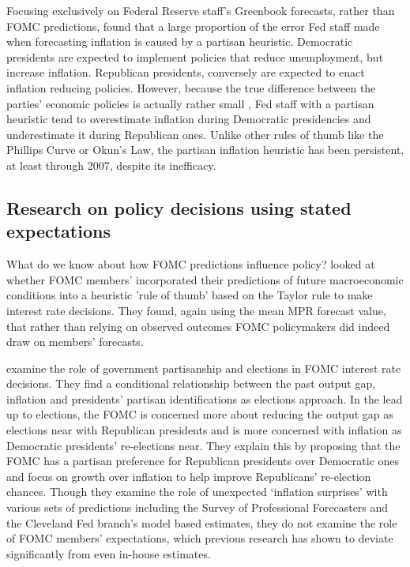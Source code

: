 \documentclass[a4paper]{article}\usepackage{graphicx, color}
\begin{document}
Focusing exclusively on Federal Reserve staff's Greenbook forecasts, rather than FOMC predictions, \cite{gandrud2013does} found that a large proportion of the error Fed staff made when forecasting inflation is caused by a partisan heuristic. Democratic presidents are expected to implement policies that reduce unemployment, but increase inflation. Republican presidents, conversely are expected to enact inflation reducing policies. However, because the true difference between the parties' economic policies is actually rather small \citep{Bartels2008}, Fed staff with a partisan heuristic tend to overestimate inflation during Democratic presidencies and underestimate it during Republican ones. Unlike other rules of thumb like the Phillips Curve or Okun's Law, the partisan inflation heuristic has been persistent, at least through 2007, despite its inefficacy.

\subsection{Research on policy decisions using stated expectations}

What do we know about how FOMC predictions influence policy? \cite{Orphanides2008} looked at whether FOMC members' incorporated their predictions of future macroeconomic conditions into  a heuristic 'rule of thumb' based on the Taylor rule \citeyearpar{Taylor1993} to make interest rate decisions. They found, again using the mean MPR forecast value, that rather than relying on observed outcomes FOMC policymakers did indeed draw on members' forecasts.   

\cite{Clark2013} examine the role of government partisanship and elections in FOMC interest rate decisions. They find a conditional relationship between the past output gap, inflation and presidents' partisan identifications as elections approach. In the lead up to elections, the FOMC is concerned more about reducing the output gap as elections near with Republican presidents and is more concerned with inflation as Democratic presidents' re-elections near. They explain this by proposing that the FOMC has a partisan preference for Republican presidents over Democratic ones and focus on growth over inflation to help improve Republicans' re-election chances. Though they examine the role of unexpected `inflation surprises' with various sets of predictions including the Survey of Professional Forecasters and the Cleveland Fed branch's model based estimates, they do not examine the role of FOMC members' expectations, which previous research has shown to deviate significantly from even in-house estimates.
\end{document}

